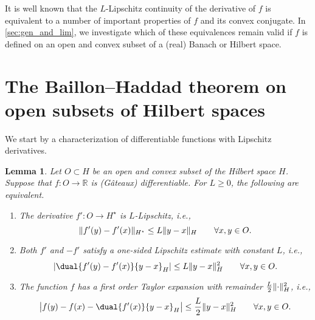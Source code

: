 \documentclass[
	english
]{scrartcl}
\numberwithin{equation}{section} %
\DeclarePairedDelimiter\abs{\lvert}{\rvert}
\DeclarePairedDelimiter\norm{\lVert}{\rVert}
\newcommand\R{\mathbb{R}}
\newcommand{\dualspace}{^\star}
\newtheorem{lemma}[theorem]{Lemma}
\begin{document}
It is well known that the $L$-Lipschitz continuity of the derivative of $f$ is
equivalent to a number of important properties of $f$ and its convex conjugate.
In \cref{sec:gen_and_lim}, we investigate which of these equivalences remain valid
if $f$ is defined on an open and convex subset of a (real) Banach or Hilbert space.


\section{The Baillon--Haddad theorem on open subsets of Hilbert spaces}
\label{sec:proof}
We start by a characterization of differentiable functions with Lipschitz derivatives.
\begin{lemma}
	\label{lem:lipschitz_derivative}
	Let $O \subset H$ be an open and convex subset of the Hilbert space $H$.
	Suppose that $f \colon O \to \R$ is (Gâteaux) differentiable.
	For $L \ge 0$, the following are equivalent.
	\begin{enumerate}
		\item
			\label{lem:lipschitz_derivative:1}
			The derivative $f' \colon O \to H\dualspace$ is $L$-Lipschitz,
			i.e.,
			\begin{equation}
				\label{eq:L_lipschitz}
				\norm{
					f'(y) - f'(x)
				}_{H\dualspace}
				\le
				L \norm{
					y - x
				}_H
				\qquad\forall x,y \in O
				.
			\end{equation}
		\item
			\label{lem:lipschitz_derivative:2}
			Both $f'$ and $-f'$ satisfy a one-sided Lipschitz estimate with constant $L$,
			i.e.,
			\begin{equation}
				\label{eq:two_sided_lipschitz}
				\abs{
					\dual{f'(y) - f'(x)}{y - x}_H
				}
				\le
				L \norm{y - x}_H^2
				\qquad\forall x,y \in O.
			\end{equation}
		\item
			\label{lem:lipschitz_derivative:3}
			The function $f$
			has a first order Taylor expansion with remainder $\frac L2 \norm{\cdot}_H^2$, i.e.,
			\begin{equation}
				\label{eq:taylor}
				\abs[\big]{
					f(y) - f(x) - \dual{f'(x)}{y - x}_H
				}
				\le
				\frac L2 \norm{y - x}_H^2
				\qquad\forall x,y \in O.
			\end{equation}
	\end{enumerate}
\end{lemma}
\end{document}
